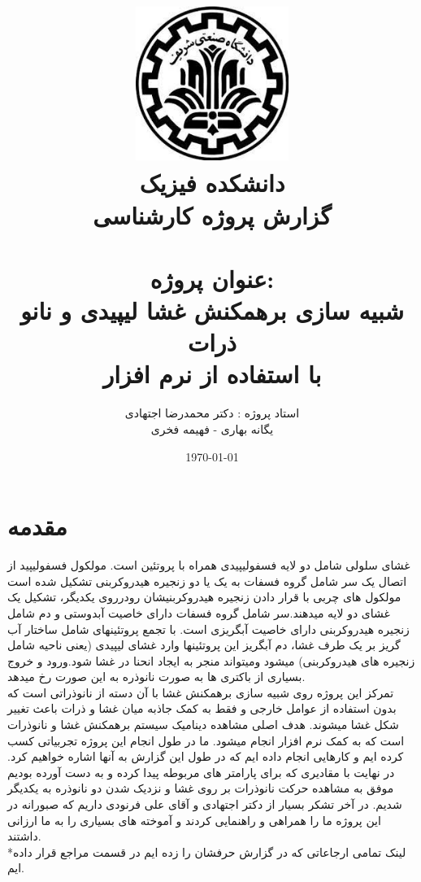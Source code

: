 \documentclass[12pt,onecolumn,a4paper]{report}
\begin{document}
\title{\includegraphics[width=5cm, height= 5cm]{3.jpg}\\\Large{دانشکده فیزیک}\\{\LARGE{گزارش پروژه کارشناسی}}\\{\\{\Huge{عنوان پروژه:}\\\Huge{شبیه سازی برهمکنش غشا لیپیدی و نانو ذرات \\با استفاده از نرم افزار  }}} }
\author{\LARGE{استاد پروژه : دکتر محمدرضا اجتهادی}\\\LARGE{یگانه بهاری - فهیمه فخری}}
\date{\LARGE{\today}}
\maketitle
\tableofcontents
\newpage

\section{\LARGE{مقدمه} }
\large{غشای سلولی شامل دو لایه فسفولیپیدی همراه با پروتئین است. مولکول فسفولیپید از اتصال یک سر شامل گروه فسفات
به یک یا دو زنجیره هیدروکربنی تشکیل شده است
مولکول های چربی با قرار دادن زنجیره هیدروکربنیشان
رودرروی یکدیگر، تشکیل یک غشای دو لایه میدهند.سر شامل گروه فسفات دارای خاصیت آبدوستی و دم شامل زنجیره هیدروکربنی دارای خاصیت
آبگریزی است. با تجمع پروتئینهای شامل ساختار
آب گریز بر یک طرف غشا، دم آبگریز این پروتئینها وارد غشای لیپیدی (یعنی ناحیه
شامل زنجیره های هیدروکربنی) میشود ومیتواند منجر به ایجاد
انحنا در غشا شود.ورود و خروج بسیاری از باکتری ها به صورت نانوذره به این صورت رخ میدهد.\\
تمرکز این پروژه روی شبیه سازی برهمکنش غشا با آن دسته از نانوذراتی است که بدون استفاده از عوامل خارجی و فقط به کمک جاذبه میان غشا و ذرات باعث تغییر شکل غشا میشوند.
هدف اصلی مشاهده دینامیک سیستم برهمکنش غشا و نانوذرات است که به کمک نرم افزار  انجام میشود.
ما در طول انجام این پروژه تجربیاتی کسب کرده ایم و کارهایی انجام داده ایم که در طول این گزارش به آنها اشاره خواهیم کرد. در نهایت با مقادیری که برای پارامتر های مربوطه پیدا کرده و به دست آورده بودیم موفق به مشاهده حرکت نانوذرات بر روی غشا و نزدیک شدن دو نانوذره به یکدیگر شدیم.
در آخر تشکر بسیار از دکتر اجتهادی و آقای علی فرنودی داریم که صبورانه در این پروژه ما را همراهی و راهنمایی کردند و آموخته های بسیاری را به ما ارزانی داشتند.\\
*لینک تمامی ارجاعاتی که در گزارش حرفشان را زده ایم در قسمت مراجع قرار داده ایم.}
\end{document}
